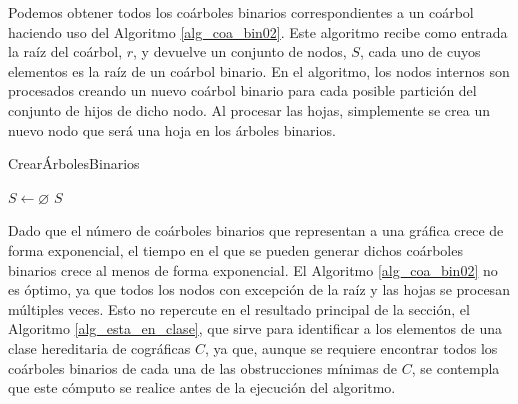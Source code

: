Podemos obtener todos los coárboles binarios correspondientes a un coárbol
haciendo uso del Algoritmo \ref{alg_coa_bin02}. Este algoritmo recibe como
entrada la raíz del coárbol, $r$, y devuelve un conjunto de nodos, $S$, cada
uno de cuyos elementos es la raíz de un coárbol binario. En el algoritmo,
los nodos internos son procesados creando un nuevo coárbol binario para cada
posible partición del conjunto de hijos de dicho nodo. Al procesar las hojas,
simplemente se crea un nuevo nodo que será una hoja en los árboles binarios.

\begin{algorithm}[ht!]
\caption{CrearÁrbolesBinarios}
\label{alg_coa_bin02}
\DontPrintSemicolon %

$S \gets \varnothing$\;
\Return $S$\;

\end{algorithm}

Dado que el número de coárboles binarios que representan a una gráfica crece de forma exponencial, el tiempo en el que se pueden generar dichos coárboles binarios crece al menos de forma exponencial. El Algoritmo \ref{alg_coa_bin02} no es óptimo, ya que todos los nodos con excepción de la raíz y las hojas se procesan múltiples veces. Esto no repercute en el resultado principal de la sección, el Algoritmo \ref{alg_esta_en_clase}, que sirve para identificar a los elementos de una clase hereditaria de cográficas $C$, ya que, aunque se requiere encontrar todos los coárboles binarios de cada una de las obstrucciones mínimas de $C$, se contempla que este cómputo se realice antes de la ejecución del algoritmo.
